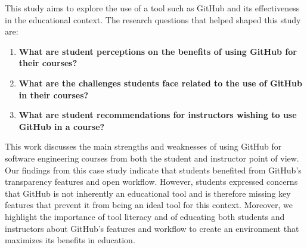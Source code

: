 
This study aims to explore the use of a tool such as GitHub and its effectiveness in the educational context. The research questions that helped shaped this study are:%
\begin{enumerate}
\item \textbf{What are student perceptions on the benefits of using GitHub for their courses?}
\item \textbf{What are the challenges students face related to the use of GitHub in their courses?}
\item \textbf{What are student recommendations for instructors wishing to use GitHub in a course?}
\end{enumerate}

This work discusses the main strengths and weaknesses of using GitHub for software engineering courses from both the student and instructor point of view. Our findings from this case study indicate that students benefited from GitHub's transparency features and open workflow. However, students expressed concerns that GitHub is not inherently an educational tool and is therefore missing key features that prevent it from being an ideal tool for this context. Moreover, we highlight the importance of tool literacy and of educating both students and instructors about GitHub's features and workflow to create an environment that maximizes its benefits in education.



